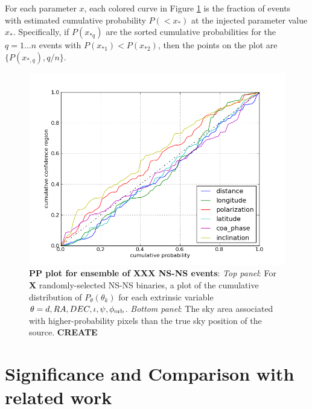 \documentclass[twocolumn,prd,nofootinbib]{revtex4}
\begin{document}

For each parameter $x$, each colored curve in Figure  \ref{fig:pp:2015Ensemble} is  the fraction of events with
estimated cumulative probability $P(<x_*)$ at the injected parameter value $x_*$.  
Specifically, if $P(x_{*q})$ are the sorted cumulative probabilities for the $q=1\ldots n$ events with
$P(x_{*1})<P(x_{*2})$, then the points on the plot are $\{P(x_{*,q}),q/n\}$.  
%

\begin{figure}
\includegraphics[width=\columnwidth]{../Figures/v2_2015_BNS_MDC_skysampling_pp_plot}  %
\caption{\label{fig:pp:2015Ensemble}\textbf{PP plot for ensemble of XXX NS-NS events}: \emph{Top panel}: For \textbf{X} randomly-selected NS-NS binaries, a plot of
  the cumulative distribution of $P_\theta(\theta_k)$ for each extrinsic variable $\theta=d,RA,DEC,\iota,\psi,\phi_{\rm
    orb}$.
\emph{Bottom panel}: The sky area associated with higher-probability pixels than the true sky position of the source. \textbf{CREATE}
}
\end{figure}


\section{Significance and Comparison with related work }
\end{document}
